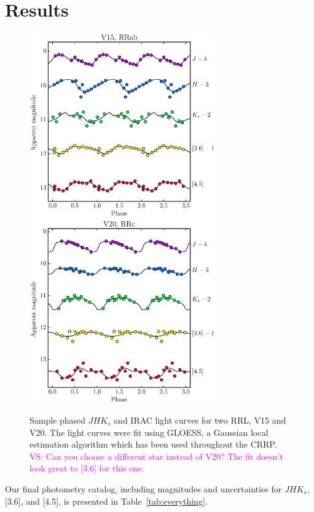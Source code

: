 \documentclass[a4paper,fleqn,usenatbib]{mnras}
\providecommand{\vscomment}[1]{{\textcolor{magenta}{{VS: #1}}}\xspace}
\begin{document}
\section{Results}
\label{sec:results}

\begin{figure}
\begin{center}
\includegraphics[width=80mm]{../ocen_only_fitting/final_plots/V15_light_curves.eps}
\includegraphics[width=80mm]{../ocen_only_fitting/final_plots/V20_light_curves.eps}
\caption{Sample phased $J\!H\!K_s$ and IRAC light curves for two RRL, V15 and V20. The light curves were fit using GLOESS, a Gaussian local estimation
algorithm which has been used throughout the CRRP. \vscomment{Can you choose a different star instead of V20? The fit doesn't look great to [3.6] for this one.} }
\label{fig:light_curves}
\end{center}
\end{figure}

Our final photometry catalog, including magnitudes and uncertainties for $J\!H\!K_s$, [3.6], and [4.5], is presented in Table~\ref{tab:everything}.
\end{document}
